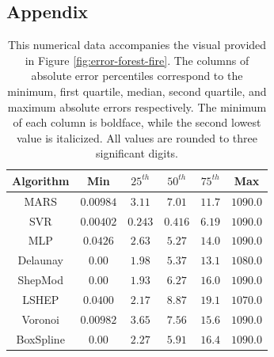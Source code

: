 \documentclass[smallextended,final]{svjour3}       %
\begin{document}
\begin{appendix}

\section*{Appendix}

\begin{table}
  \centering
  \begin{tabular}{c|c|c|c|c|c}
    \hline
    Algorithm & Min & $25^{th}$ & $50^{th}$ & $75^{th}$ & Max\\
    \hline
    MARS & $0.00984$ & $3.11$ & $7.01$ & $\mathit{11.7}$ & $1090.0$\\
    SVR & $\mathit{0.00402}$ & $\mathbf{0.243}$ & $\mathbf{0.416}$ & $\mathbf{6.19}$ & $1090.0$\\
    MLP & $0.0426$ & $2.63$ & $\mathit{5.27}$ & $14.0$ & $1090.0$\\
    Delaunay & $\mathbf{0.00}$ & $1.98$ & $5.37$ & $13.1$ & $\mathit{1080.0}$\\
    ShepMod & $\mathbf{0.00}$ & $\mathit{1.93}$ & $6.27$ & $16.0$ & $1090.0$\\
    LSHEP & $0.0400$ & $2.17$ & $8.87$ & $19.1$ & $\mathbf{1070.0}$\\
    Voronoi & $0.00982$ & $3.65$ & $7.56$ & $15.6$ & $1090.0$\\
    BoxSpline & $\mathbf{0.00}$ & $2.27$ & $5.91$ & $16.4$ & $1090.0$\\
    \hline
  \end{tabular}
  \caption{This numerical data accompanies the visual provided in
    Figure \ref{fig:error-forest-fire}. The columns of absolute error
    percentiles correspond to the minimum, first quartile, median,
    second quartile, and maximum absolute errors respectively. The
    minimum of each column is boldface, while the second lowest value
    is italicized. All values are rounded to three significant
    digits.}
  \label{table:error-forest-fire}
\end{table}


\end{appendix}
\end{document}
